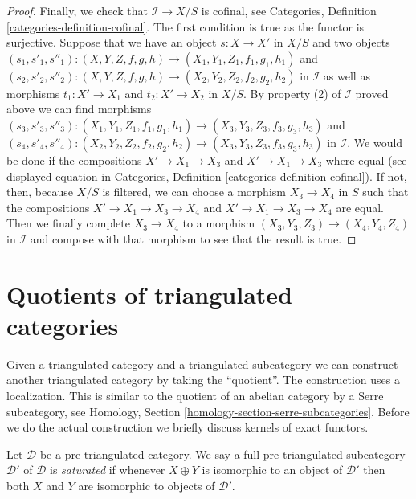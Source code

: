 \begin{proof}
\medskip\noindent
Finally, we check that $\mathcal{I} \to X/S$ is cofinal, see
Categories, Definition \ref{categories-definition-cofinal}.
The first condition is true as the functor is surjective.
Suppose that we have an object $s : X \to X'$ in $X/S$ and
two objects
$(s_1, s'_1, s''_1) : (X, Y, Z, f, g, h) \to (X_1, Y_1, Z_1, f_1, g_1, h_1)$
and
$(s_2, s'_2, s''_2) : (X, Y, Z, f, g, h) \to (X_2, Y_2, Z_2, f_2, g_2, h_2)$
in $\mathcal{I}$ as well as morphisms $t_1 : X' \to X_1$ and
$t_2 : X' \to X_2$ in $X/S$. By property (2) of $\mathcal{I}$
proved above we can find morphisms
$(s_3, s'_3, s''_3) : (X_1, Y_1, Z_1, f_1, g_1, h_1) \to
(X_3, Y_3, Z_3, f_3, g_3, h_3)$
and
$(s_4, s'_4, s''_4) : (X_2, Y_2, Z_2, f_2, g_2, h_2) \to
(X_3, Y_3, Z_3, f_3, g_3, h_3)$ in $\mathcal{I}$.
We would be done if the compositions
$X' \to X_1 \to X_3$ and $X' \to X_1 \to X_3$ where equal
(see displayed equation in 
Categories, Definition \ref{categories-definition-cofinal}).
If not, then, because $X/S$ is filtered, we can choose
a morphism $X_3 \to X_4$ in $S$ such that the compositions
$X' \to X_1 \to X_3 \to X_4$ and $X' \to X_1 \to X_3 \to X_4$ are equal.
Then we finally complete $X_3 \to X_4$ to a morphism
$(X_3, Y_3, Z_3) \to (X_4, Y_4, Z_4)$ in $\mathcal{I}$
and compose with that morphism to see that the result is true.
\end{proof}









\section{Quotients of triangulated categories}
\label{section-quotients}

\noindent
Given a triangulated category and a triangulated subcategory we can
construct another triangulated category by taking the ``quotient''.
The construction uses a localization. This is similar to the quotient
of an abelian category by a Serre subcategory, see
Homology, Section \ref{homology-section-serre-subcategories}.
Before we do the actual construction we briefly discuss kernels
of exact functors.

\begin{definition}
\label{definition-saturated}
Let $\mathcal{D}$ be a pre-triangulated category. We say a full
pre-triangulated subcategory $\mathcal{D}'$ of $\mathcal{D}$ is
{\it saturated} if whenever $X \oplus Y$ is isomorphic to an object
of $\mathcal{D}'$ then both $X$ and $Y$ are isomorphic to objects
of $\mathcal{D}'$.
\end{definition}

